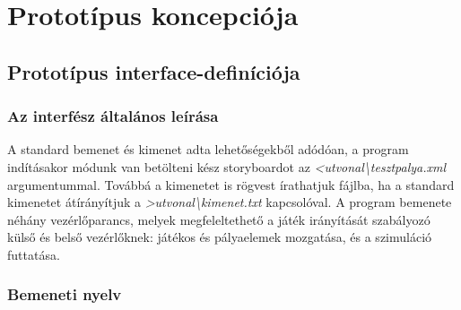 


\setcounter{section}{6}




\fedlap

\section{Prototípus koncepciója}

\subsection{Prototípus interface-definíciója}

\subsubsection{Az interfész általános leírása}
A standard bemenet és kimenet adta lehetőségekből adódóan, a program indításakor módunk van betölteni kész storyboardot az \emph{\textless  utvonal\textbackslash tesztpalya.xml} argumentummal. Továbbá a kimenetet is rögvest írathatjuk fájlba, ha a standard kimenetet átírányítjuk a \emph{\textgreater  utvonal\textbackslash kimenet.txt} kapcsolóval.
A program bemenete néhány vezérlőparancs, melyek megfeleltethető a játék irányítását szabályozó külső és belső vezérlőknek: játékos és pályaelemek mozgatása, és a szimuláció futtatása.

\subsubsection{Bemeneti nyelv}


